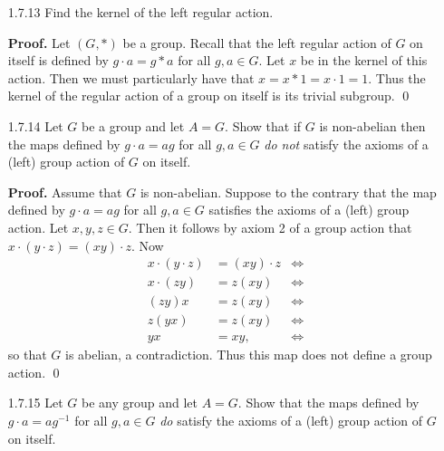 \begin{enumerate}
      Now consider a pair of vertices $\{x, x + k\} \in P$. It follows that
      $$r \cdot \{x, x + k\} = \{(x + 1, x + k + 1\} \in P$$
      because $x + k + 1 - (x + 1) = k$. Assume $x = 1$. Since $s$ fixes 1 and
      $k + 1$, it must also fix $\{x, x + 1\}$. Now assume $2 \le x \le k$. Thus
      $$s \cdot \{x, x + k\} = \{2k+2 - x, 2k+2-x-k\} \in P.$$
      We have thus shown that $r$ and $s$ send every opposite pair to another
      opposite pair; since $r$ and $s$ generate it follows that every member of
      $D_{2n}$ maps an opposite pair to another opposite pair. Since we are
      regarding $r$ and $s$ as permutations in $S_n$, axiom 2 immediately
      follows by the composition of permutations. The kernel of this action is
      $\{1, r^k\}$. \qed
   \item[1.7.13]  Find the kernel of the left regular action.

      \textbf{Proof.} Let $(G, *)$ be a group. Recall that the left regular 
      action of $G$ on itself is defined by $g \cdot a = g * a$ for all
      $g, a \in G$. Let $x$ be in the kernel of this action. Then we must
      particularly have that $x = x * 1 = x \cdot 1 = 1$. Thus the kernel of the
      regular action of a group on itself is its trivial subgroup.
      \qed
   \item[1.7.14]  Let $G$ be a group and let $A = G$. Show that if $G$ is
                  non-abelian then the maps defined by $g \cdot a = ag$ for all
                  $g, a \in G$ \textit{do not} satisfy the axioms of a (left)
                  group action of $G$ on itself.

      \textbf{Proof.} Assume that $G$ is non-abelian. Suppose to the contrary 
      that the map defined by $g \cdot a = ag$ for all $g, a \in G$ satisfies
      the axioms of a (left) group action. Let $x, y, z \in G$. Then it follows
      by axiom 2 of a group action that $x \cdot (y \cdot z) = (xy) \cdot z$.
      Now
      \begin{align*}
         x \cdot (y \cdot z) &= (xy)\cdot z &\Longleftrightarrow \\
         x \cdot (zy) &= z(xy) &\Longleftrightarrow \\
         (zy)x &= z(xy) &\Longleftrightarrow \\
         z(yx) &= z(xy) &\Longleftrightarrow \\
         yx &= xy, &\Longleftrightarrow
      \end{align*}
      so that $G$ is abelian, a contradiction. Thus this map does not define a
      group action. \qed
   \item[1.7.15]  Let $G$ be any group and let $A = G$. Show that the maps
                  defined by $g \cdot a = ag^{-1}$ for all $g, a \in G$
                  \textit{do} satisfy the axioms of a (left) group action of $G$
                  on itself.


\end{enumerate}

